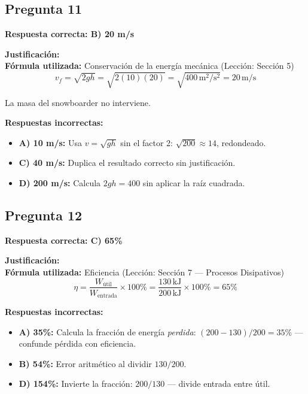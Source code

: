 \begin{respuestabox}
\subsection{Pregunta 11}
\textcolor{verdecorrecto}{\textbf{Respuesta correcta: B) 20 m/s}}

\textbf{Justificación:}\\
\textbf{Fórmula utilizada:} Conservación de la energía mecánica (Lección: Sección 5)
$$v_f = \sqrt{2gh} = \sqrt{2(10)(20)} = \sqrt{400\,\text{m}^2/\text{s}^2} = 20\,\text{m/s}$$

La masa del snowboarder no interviene.

\textbf{Respuestas incorrectas:}
\begin{itemize}
    \item \textbf{A) 10 m/s:} Usa $v = \sqrt{gh}$ sin el factor 2: $\sqrt{200} \approx 14$, redondeado.
    \item \textbf{C) 40 m/s:} Duplica el resultado correcto sin justificación.
    \item \textbf{D) 200 m/s:} Calcula $2gh = 400$ sin aplicar la raíz cuadrada.
\end{itemize}
\end{respuestabox}

\begin{respuestabox}
\subsection{Pregunta 12}
\textcolor{verdecorrecto}{\textbf{Respuesta correcta: C) 65\%}}

\textbf{Justificación:}\\
\textbf{Fórmula utilizada:} Eficiencia (Lección: Sección 7 --- Procesos Disipativos)
$$\eta = \frac{W_{\text{útil}}}{W_{\text{entrada}}} \times 100\% = \frac{130\,\text{kJ}}{200\,\text{kJ}} \times 100\% = 65\%$$

\textbf{Respuestas incorrectas:}
\begin{itemize}
    \item \textbf{A) 35\%:} Calcula la fracción de energía \textit{perdida}: $(200-130)/200 = 35\%$ --- confunde pérdida con eficiencia.
    \item \textbf{B) 54\%:} Error aritmético al dividir $130/200$.
    \item \textbf{D) 154\%:} Invierte la fracción: $200/130$ --- divide entrada entre útil.
\end{itemize}
\end{respuestabox}

